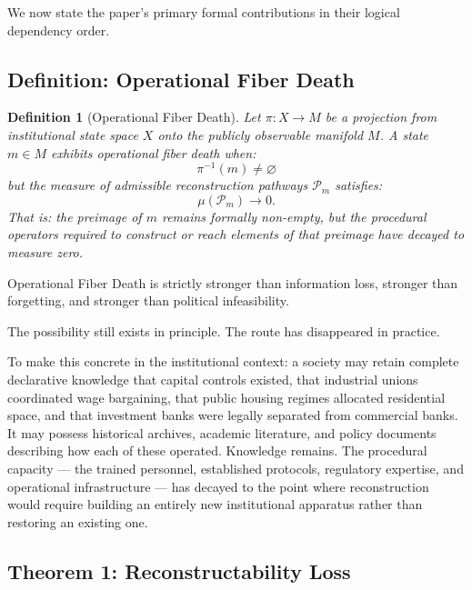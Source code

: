 \documentclass[12pt, a4paper]{article}
\theoremstyle{named}
\newtheorem{definition}{Definition}
\begin{document}
We now state the paper's primary formal contributions in their logical
dependency order.

\subsection{Definition: Operational Fiber Death}

\begin{definition}[Operational Fiber Death]
Let $\pi: X \to M$ be a projection from institutional state space $X$
onto the publicly observable manifold $M$. A state $m \in M$ exhibits
\emph{operational fiber death} when:
\[
  \pi^{-1}(m) \neq \varnothing
\]
but the measure of admissible reconstruction pathways $\mathcal{P}_m$
satisfies:
\[
  \mu(\mathcal{P}_m) \to 0.
\]
That is: the preimage of $m$ remains formally non-empty, but the
procedural operators required to construct or reach elements of that
preimage have decayed to measure zero.
\end{definition}

Operational Fiber Death is strictly stronger than information loss,
stronger than forgetting, and stronger than political infeasibility.

\begin{thmbox}
The possibility still exists in principle. The route has disappeared
in practice.
\end{thmbox}

To make this concrete in the institutional context: a society may
retain complete declarative knowledge that capital controls existed,
that industrial unions coordinated wage bargaining, that public housing
regimes allocated residential space, and that investment banks were
legally separated from commercial banks. It may possess historical
archives, academic literature, and policy documents describing how each
of these operated. Knowledge remains. The procedural capacity — the
trained personnel, established protocols, regulatory expertise, and
operational infrastructure — has decayed to the point where
reconstruction would require building an entirely new institutional
apparatus rather than restoring an existing one.

\subsection{Theorem 1: Reconstructability Loss}
\end{document}
